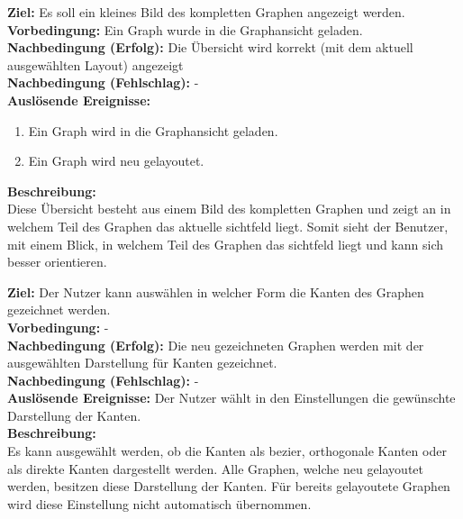 \label{fa:uebersicht}
\textbf{Ziel:} Es soll ein kleines Bild des kompletten Graphen angezeigt werden.\\
\textbf{Vorbedingung:} Ein Graph wurde in die Graphansicht geladen.\\
\textbf{Nachbedingung (Erfolg):} Die Übersicht wird korrekt (mit dem aktuell ausgewählten Layout) angezeigt\\
\textbf{Nachbedingung (Fehlschlag):} -\\
\textbf{Auslösende Ereignisse:}
\begin{enumerate}[nolistsep, label=(\alph*)]
  \item Ein Graph wird in die Graphansicht geladen.
  \item Ein Graph wird neu gelayoutet.
\end{enumerate}
\textbf{Beschreibung:}\\
Diese Übersicht besteht aus einem Bild des kompletten Graphen und zeigt an in welchem Teil des Graphen das aktuelle \gls{sichtfeld} liegt. Somit sieht der Benutzer, mit einem Blick, in welchem Teil des Graphen das \gls{sichtfeld} liegt und kann sich besser orientieren.

\label{fa:darst-kanten}
\textbf{Ziel:} Der Nutzer kann auswählen in welcher Form die Kanten des Graphen gezeichnet werden. \\
\textbf{Vorbedingung:} -\\
\textbf{Nachbedingung (Erfolg):} Die neu gezeichneten Graphen werden mit der ausgewählten Darstellung für Kanten gezeichnet. \\
\textbf{Nachbedingung (Fehlschlag):} -\\
\textbf{Auslösende Ereignisse:} Der Nutzer wählt in den Einstellungen die gewünschte Darstellung der Kanten.\\
\textbf{Beschreibung:}\\
Es kann ausgewählt werden, ob die Kanten als \gls{bezier}, orthogonale Kanten oder als direkte Kanten dargestellt werden. Alle Graphen, welche neu gelayoutet werden, besitzen diese Darstellung der Kanten. Für bereits gelayoutete Graphen wird diese Einstellung nicht automatisch übernommen.

